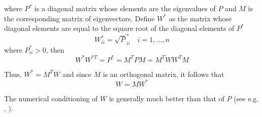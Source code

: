 where \(P^*\) is a diagonal matrix whose elements are the eigenvalues of \(P\) and 
\(M\) is the corresponding matrix of eigenvectors. Define \(W^*\) as the matrix 
whose diagonal elements are equal to the square root of the diagonal elements of \(P^*\)
\begin{equation}
  W^*_{ii} = \sqrt P^*_{ii} \quad i=1,\ldots ,n
\end{equation}
where \(P^*_{ii} > 0\), then
\begin{equation}
 W^* W^{*T} = P^* = M^T P M = M^T W W^T M
\end{equation}

Thus, \(W^* = M^T W \) and since \(M\) is an orthogonal matrix, it follows that
\begin{equation}
  \label{eq:tapley574}
  W = M W^*
\end{equation}

The numerical conditioning of \(W\) is generally much better than that of \(P\) (see 
e.g. \cite{lawson1995}, \cite{tapley}).
